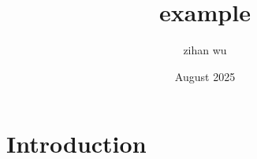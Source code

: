 \documentclass{article}
\title{example}
\author{zihan wu}
\date{August 2025}
\begin{document}
\maketitle

\section{Introduction}
\end{document}
